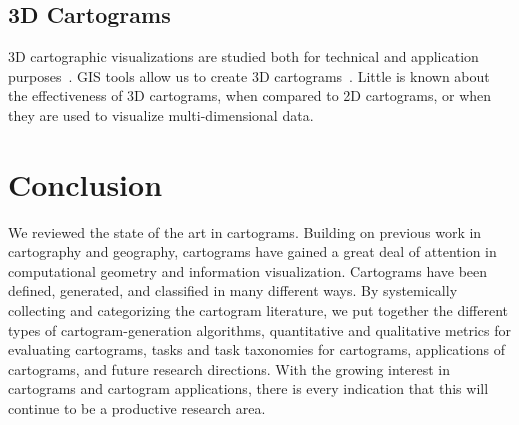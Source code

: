 \documentclass{egpubl}
\begin{document}
\begin{comment}
Also, to merge data and uncertainty, one of the three following approaches are taken~\cite{maceachren1992visualizing}:

\begin{itemize}
\item Map pairs: a data map is depicted side-by-side with a map of uncertainty about that data 
\item Sequential presentation: Initial map is followed by a map of uncertainty. Interactive techniques can also be employed to show uncertainty. In this case, user can ``toggle'' between data and uncertainty.
\item Bivariate choropleth maps: In such cases, data is shown by color, and uncertainty by texture.

\end{itemize}

Merging both data and uncertainty and visually compare/combine those could be challenging. Research shows that it is difficult to compare the magnitudes of two attributes in multivariate visualizations when they are represented using different methods (e.g., size and color)~\cite{ramachandran2009visualizing}. As explained in section~\ref{multivar}, mapping both data and uncertainty in the same map (bivariate choropleth maps) can make the maps cluttered. Since cartograms show the data magnitude with size, using one of the other techniques (focus, clarity, fog etc.) could be used to uncertainty. Cartograms need to explored as means to effectively communicate data and uncertainty. 
\end{comment}

\subsection{3D Cartograms}

 3D cartographic visualizations are studied both for technical and application purposes~\cite{KNP04, nollenburg2007geographic, WP-3D}. GIS tools allow us to create 3D cartograms~\cite{3d-carto1}. Little is known about the effectiveness of 3D cartograms, when compared to 2D cartograms, or when they are used to visualize multi-dimensional data.


\section{Conclusion}
We reviewed the state of the art in cartograms. Building on previous work in cartography and geography, cartograms have gained a great deal of attention in computational geometry and information visualization. Cartograms have been defined, generated, and classified in many different ways. 
By systemically collecting and categorizing the cartogram literature, we put together the different types of cartogram-generation algorithms, quantitative and qualitative metrics for evaluating cartograms, tasks and task taxonomies for cartograms, applications of cartograms, and future research directions.
With the growing interest in cartograms and cartogram applications, there is every indication that this will continue to be a productive research area. 
\end{document}

